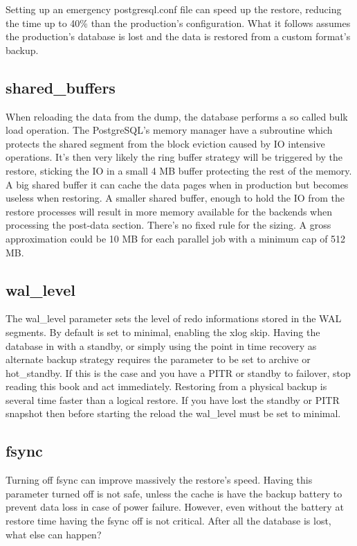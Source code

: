 Setting up an emergency postgresql.conf file can speed up the restore, reducing the time up to 40\% 
than the production's configuration. What it follows assumes the production's database is lost and 
the data is restored from a custom format's backup. 

\subsection{shared\_buffers}
When reloading the data from the dump, the database performs a so called bulk load operation. The 
PostgreSQL's memory manager have a subroutine which protects the shared segment from the block 
eviction caused by IO intensive operations. It's then very likely the ring buffer strategy will be 
triggered by the restore, sticking the IO in a small 4 MB buffer protecting the rest of the memory. 
A big shared buffer it can cache the data pages when in production but becomes useless when 
restoring. A smaller shared buffer, enough to hold the IO from  the restore processes will result 
in more memory available for the backends when processing the post-data section. There's no fixed 
rule for the sizing. A gross approximation could be 10 MB for each parallel job with a minimum cap 
of 512 MB.   

\subsection{wal\_level}
The wal\_level parameter sets the level of redo informations stored in the WAL segments. By default 
is set to minimal, enabling the xlog skip. Having the database in with a standby, or simply using 
the point in time recovery as alternate backup strategy requires the parameter to be set to archive 
or hot\_standby. If this is the case and you have a PITR or standby to failover, stop reading 
this book and act immediately. Restoring from a physical backup is several time faster than a 
logical restore. If you have lost the standby or PITR snapshot then before starting the reload the 
wal\_level must be set to minimal.

\subsection{fsync}
Turning off fsync can improve massively the restore's speed. Having this parameter turned off
is not safe, unless the cache is have the backup battery to prevent data loss in case of power
failure. However, even without the battery at restore time having the fsync off is not critical.
After all the database is lost, what else can happen?

